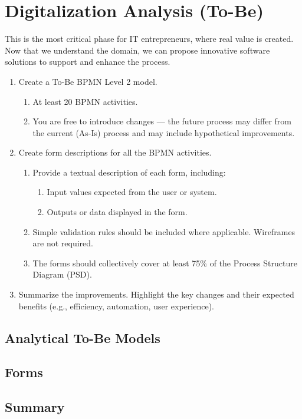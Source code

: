 \chapter{Digitalization Analysis (To-Be)}\label{sec:to-be}


This is the most critical phase for IT entrepreneurs, where real value is created. Now that we understand the domain, we can propose innovative software solutions to support and enhance the process. 

\begin{enumerate}
    \item Create a To-Be BPMN Level 2 model.
        \begin{enumerate}
            \item At least 20 BPMN activities.
            \item You are free to introduce changes — the future process may differ from the current (As-Is) process and may include hypothetical improvements.
        \end{enumerate}
    \item Create form descriptions for all the BPMN activities.
     \begin{enumerate}
            \item Provide a textual description of each form, including:
            \begin{enumerate}
            	\item Input values expected from the user or system.
            	\item Outputs or data displayed in the form.
            \end{enumerate}
            \item Simple validation rules should be included where applicable. Wireframes are not required.
            \item The forms should collectively cover at least 75\% of the Process Structure Diagram (PSD).
        \end{enumerate}
    \item Summarize the improvements. Highlight the key changes and their expected benefits (e.g., efficiency, automation, user experience).
\end{enumerate}

\section{Analytical To-Be Models}

\section{Forms}

\section{Summary}
